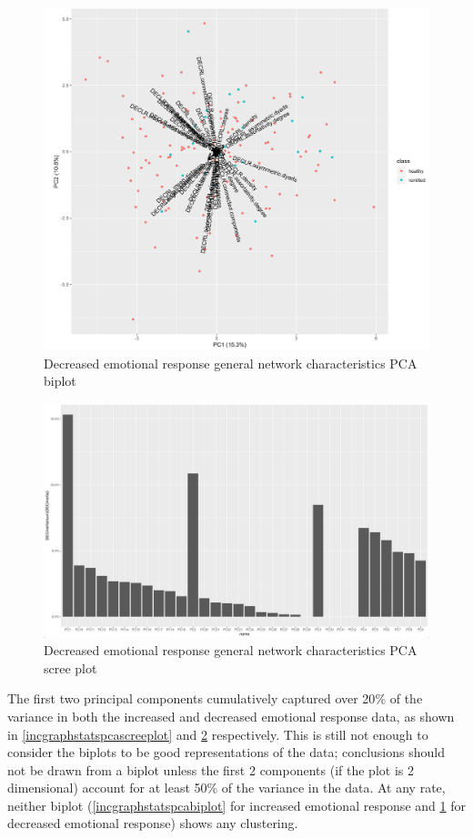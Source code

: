 \documentclass[12pt]{report}
\begin{document}
		\begin{figure}[H]
			\centering
			\includegraphics[scale=0.25]{Images/DECgraphstats_biplot.png}
			\caption{Decreased emotional response general network characteristics PCA biplot}
			\label{decgraphstatspcabiplot}
		\end{figure}
		
		\begin{figure}[H]
			\centering
			\includegraphics[scale=0.2]{Images/DECgraphstats_screeplot.png}
			\caption{Decreased emotional response general network characteristics PCA scree plot}
			\label{decgraphstatspcascreeplot}
		\end{figure}
		
		The first two principal components cumulatively captured over 20$\%$ of the variance in both the increased and decreased emotional response data, as shown in \ref{incgraphstatspcascreeplot} and \ref{decgraphstatspcascreeplot} respectively. This is still not enough to consider the biplots to be good representations of the data; conclusions should not be drawn from a biplot unless the first 2 components (if the plot is 2 dimensional) account for at least 50$\%$ of the variance in the data. At any rate, neither biplot (\ref{incgraphstatspcabiplot} for increased emotional response and \ref{decgraphstatspcabiplot} for decreased emotional response) shows any clustering.
		
\end{document}
